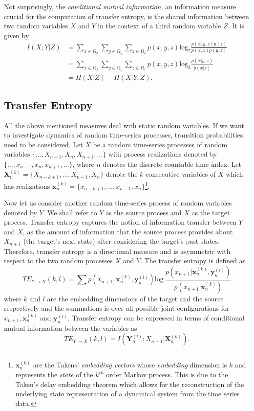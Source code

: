 \documentclass[letterpaper, 10 pt, conference]{ieeeconf}  %
\begin{document}
Not surprisingly, the \textit{conditional mutual information}, an information measure crucial for the computation of transfer entropy, is the shared information between two random variables $X$ and $Y$ in the context of a third random variable $Z$. It is given by
\begin{align*}
I(X;Y | Z) &= \sum_{x \in \Omega_x}^{}\sum_{y \in \Omega_y}^{}\sum_{z \in \Omega_z}^{}p(x,y,z)\text{log}_2\frac{p(x,y,z)p(z)}{p(x,z)p(y,z)} \\
&= \sum_{x \in \Omega_x}^{}\sum_{y \in \Omega_y}^{}\sum_{z \in \Omega_z}^{}p(x,y,z)\text{log}_2\frac{p(x|y,z)}{p(x|z)}\\
&= H(X|Z) - H(X|Y,Z).
\end{align*}
\subsection{Transfer Entropy}
All the above mentioned measures deal with static random variables. If we want to investigate dynamics of random time-series processes, transition probabilities need to be considered. Let $X$ be a random time-series processes of random variables $\{\dots, X_{n-1}, X_n, X_{n+1}, \dots\}$ with process realizations denoted by $\{\dots, x_{n-1}, x_n, x_{n+1}, \dots\}$, where $n$ denotes the discrete countable time index. Let $\boldsymbol{X}_n^{(k)} = \{X_{n-k+1},\dots,X_{n-1}, X_n\}$ denote the $k$ consecutive variables of $X$ which has realizations $\boldsymbol{x}_n^{(k)} = \{x_{n-k+1},\dots,x_{n-1}, x_n\}$\footnote{$\boldsymbol{x}_n^{(k)}$ are the Takens' \textit{embedding vectors} whose \textit{embedding} dimension is $k$ and represents the \textit{state} of the $k^{th}$ order Markov process. This is due to the Taken's delay embedding theorem which allows for the reconstruction of the underlying state representation of a dynamical system from the time series data.}. 

Now let us consider another random time-series process of random variables denoted by $Y$. We shall refer to $Y$ as the source process and $X$ as the target process. Transfer entropy captures the notion of information transfer between $Y$ and $X$, as the amount of information that the source process provides about $X_{n+1}$ (the target's next state) after considering the target's past states. Therefore, transfer entropy is a directional measure and is asymmetric with respect to the two random processes $X$ and $Y$. The transfer entropy is defined as 
\begin{equation*}
TE_{Y \rightarrow X}(k,l) = \sum_{}^{}p(x_{n+1}, \boldsymbol{x}_n^{(k)}, \boldsymbol{y}_n^{(l)})\text{log}~\frac{p(x_{n+1} | \boldsymbol{x}_n^{(k)}, \boldsymbol{y}_n^{(l)})}{p(x_{n+1}|\boldsymbol{x}_n^{(k)})}
\end{equation*}
where $k$ and $l$ are the embedding dimensions of the target and the source respectively and the summations is over all possible joint configurations for $x_{n+1}, \boldsymbol{x}_n^{(k)}$ and $\boldsymbol{y}_n^{(l)}$. 
Transfer entropy can be expressed in terms of conditional mutual information between the variables as
\begin{equation*}
TE_{Y \rightarrow X}(k,l) = I(\boldsymbol{Y}_n^{(l)}; X_{n+1}|\boldsymbol{X}_n^{(k)}).
\end{equation*}
\end{document}
